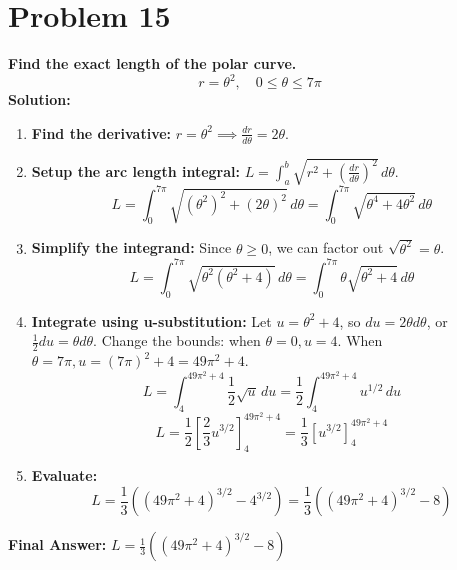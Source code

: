 \documentclass{article}
\begin{document}
\section*{Problem 15}
\textbf{Find the exact length of the polar curve.}
\[ r = \theta^2, \quad 0 \le \theta \le 7\pi \]
\textbf{Solution:}
\begin{enumerate}
    \item \textbf{Find the derivative:} $r = \theta^2 \implies \frac{dr}{d\theta} = 2\theta$.
    \item \textbf{Setup the arc length integral:} $L = \int_{a}^{b} \sqrt{r^2 + (\frac{dr}{d\theta})^2} \,d\theta$.
    \[ L = \int_{0}^{7\pi} \sqrt{(\theta^2)^2 + (2\theta)^2} \,d\theta = \int_{0}^{7\pi} \sqrt{\theta^4 + 4\theta^2} \,d\theta \]
    \item \textbf{Simplify the integrand:} Since $\theta \ge 0$, we can factor out $\sqrt{\theta^2} = \theta$.
    \[ L = \int_{0}^{7\pi} \sqrt{\theta^2(\theta^2 + 4)} \,d\theta = \int_{0}^{7\pi} \theta \sqrt{\theta^2 + 4} \,d\theta \]
    \item \textbf{Integrate using u-substitution:} Let $u = \theta^2 + 4$, so $du = 2\theta d\theta$, or $\frac{1}{2}du = \theta d\theta$.
    Change the bounds: when $\theta=0, u=4$. When $\theta=7\pi, u=(7\pi)^2+4 = 49\pi^2+4$.
    \[ L = \int_{4}^{49\pi^2+4} \frac{1}{2} \sqrt{u} \,du = \frac{1}{2} \int_{4}^{49\pi^2+4} u^{1/2} \,du \]
    \[ L = \frac{1}{2} \left[ \frac{2}{3} u^{3/2} \right]_{4}^{49\pi^2+4} = \frac{1}{3} \left[ u^{3/2} \right]_{4}^{49\pi^2+4} \]
    \item \textbf{Evaluate:}
    \[ L = \frac{1}{3} \left( (49\pi^2+4)^{3/2} - 4^{3/2} \right) = \frac{1}{3} \left( (49\pi^2+4)^{3/2} - 8 \right) \]
\end{enumerate}
\textbf{Final Answer:} $L = \frac{1}{3}((49\pi^2+4)^{3/2} - 8)$
\end{document}
